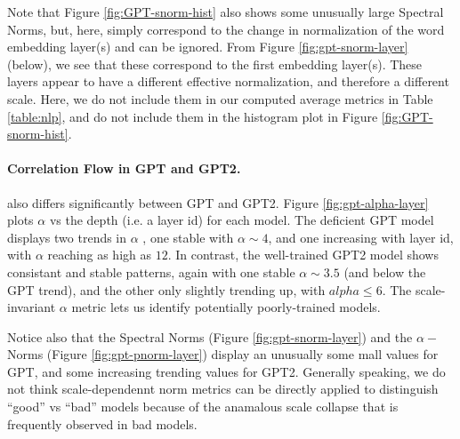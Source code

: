 Note that Figure \ref{fig:GPT-snorm-hist} also shows some unusually large Spectral Norms, but,
here, simply correspond to the change in normalization of the word embedding layer(s) and can be ignored.
From Figure \ref{fig:gpt-snorm-layer} (below), we see that these correspond to the first embedding layer(s).
These layers appear to have a different effective normalization, and therefore a different scale.
Here, we do not include them in our computed average metrics in Table \ref{table:nlp},
and do not include them in the histogram plot in Figure \ref{fig:GPT-snorm-hist}.

\paragraph{Correlation Flow in GPT and GPT2.} 

also differs significantly between GPT and GPT2.
Figure \ref{fig:gpt-alpha-layer} plots $\alpha$ vs the depth (i.e. a layer id) for each model.
The deficient GPT model displays two trends in $\alpha$ , one stable with $\alpha\sim 4$,
and one increasing with layer id, with $\alpha$ reaching as high as $12$.
In contrast, the well-trained GPT2 model shows consistant and stable patterns, again
with one stable $\alpha\sim 3.5$ (and below the GPT trend), and the other only
slightly trending up, with $alpha\le 6$. 
The scale-invariant $\alpha$ metric lets us identify potentially
poorly-trained models.

Notice also that the Spectral Norms
(Figure \ref{fig:gpt-snorm-layer})
and the $\alpha-$Norms
(Figure \ref{fig:gpt-pnorm-layer})
display an unusually some mall values for GPT,
and some increasing trending values for GPT2.
Generally speaking, we do not think scale-dependennt 
norm metrics can be directly applied to distinguish ``good'' vs ``bad'' models 
because of the anamalous scale collapse that is frequently observed in bad models.

